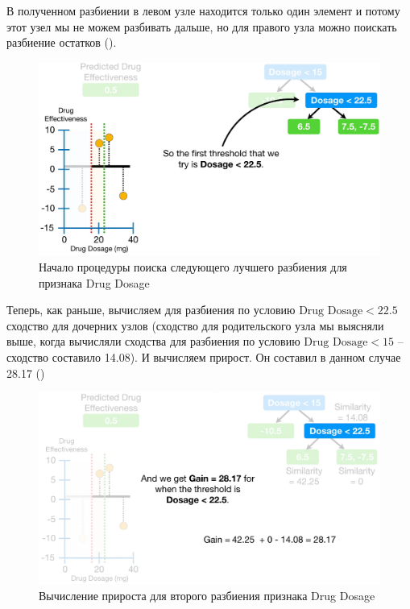 \documentclass[%
	11pt,
	a4paper,
	utf8,
		]{article}
\begin{document}
В полученном разбиении в левом узле находится только один элемент и потому этот узел мы не можем разбивать дальше, но для правого узла можно поискать разбиение остатков ().

\begin{figure}[h]
	\centering
	\includegraphics[scale=0.35]{figures/xgboost_second_split.png}
	\caption{ Начало процедуры поиска следующего лучшего разбиения для признака Drug Dosage }\label{fig:xgboost_second_split}
\end{figure}

Теперь, как раньше, вычисляем для разбиения по условию $ \text{Drug Dosage} < 22.5 $ сходство для дочерних узлов (сходство для родительского узла мы выясняли выше, когда вычисляли сходства для разбиения по условию $ \text{Drug Dosage} < 15 $ -- сходство составило 14.08). И вычисляем прирост. Он составил в данном случае 28.17 ()

\begin{figure}[h]
	\centering
	\includegraphics[scale=0.35]{figures/xgboost_gain2.png}
	\caption{ Вычисление прироста для второго разбиения признака Drug Dosage }\label{fig:xgboost_gain2}
\end{figure}
\end{document}
